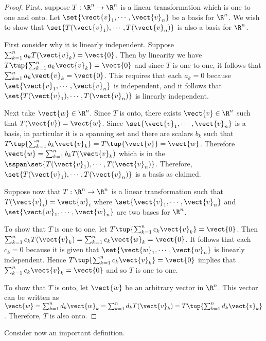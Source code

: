 \begin{proof}
First, suppose $T:\R^n \to \R^n$ is a linear
transformation which is one to one and onto. Let $\set{
\vect{v}_{1},\cdots ,\vect{v}_{n}} $ be a basis for
$\R^n$. We wish to show that $\set{T(\vect{v}_{1}),\cdots ,
T(\vect{v}_{n})} $ is also a basis for $\R^n$. 

First consider why it is linearly independent. Suppose
$\sum_{k=1}^{n}a_{k}T(\vect{v}_{k})=\vect{0}$. Then by linearity we have $T\tup{
\sum_{k=1}^{n}a_{k}\vect{v}_{k}} =\vect{0}$ and since $T$ is one
to one, it follows that $\sum_{k=1}^{n}a_{k}\vect{v}_{k}=\vect{0}$.
This requires that  each $a_{k}=0$ because $\set{\vect{v}_{1},\cdots,
\vect{v}_{n}} $ is independent, and it follows that $\set{
T(\vect{v}_{1}),\cdots , T(\vect{v}_{n})} $ is linearly
independent. 


Next take $\vect{w}\in \R^n$. Since $T$ is onto,
there exists $\vect{v}\in \R^n$ such that
$T(\vect{v})=\vect{w}$. Since $ \set{\vect{v}_{1},\cdots
,\vect{v}_{n}} $ is a basis, in particular it is a spanning set
and there are scalars $b_{k}$ such that $T\tup{
\sum_{k=1}^{n}b_{k}\vect{v} _{k}} =T\tup{\vect{v}}
=\vect{w}$. Therefore $\vect{w} =\sum_{k=1}^{n}b_{k}T(\vect{v}_{k})$
which is in the $\sspan\set{T(\vect{v}_{1}),\cdots ,
T(\vect{v}_{n})}$. Therefore, $\set{T(\vect{v}_{1}),\cdots
,T(\vect{v}_{n}) } $ is a basis as claimed.

Suppose now that $T: \R^n \to \R^n$ is a linear
transformation such that $T(\vect{v}_{i})=\vect{w}_{i}$ where
$\set{\vect{v} _{1},\cdots ,\vect{v}_{n}} $ and $\set{
\vect{w}_{1},\cdots , \vect{w}_{n}} $ are two bases for
$\R^n$. 

To show that $T$ is one to one, let $T\tup{
\sum_{k=1}^{n}c_{k}\vect{v}_{k}} =\vect{0}$. Then
$\sum_{k=1}^{n}c_{k}T(\vect{v}_{k})=\sum_{k=1}^{n}c_{k}\vect{w}_{k}=\vect{
0}$. It follows that each $c_{k} = 0$ because it is given that
$\set{\vect{w} _{1},\cdots ,\vect{w}_{n}} $ is linearly
independent. Hence $T\tup{\sum_{k=1}^{n}c_{k}\vect{v}_{k}}
=\vect{0}$ implies that $\sum_{k=1}^{n}c_{k}\vect{v}_{k}=\vect{0}$ and
so $T$ is one to one.  

To show that $T$ is onto, let $\vect{w}$ be an arbitrary vector in
$\R^n$. This vector can be written as $\vect{w} =
\sum_{k=1}^{n}d_k\vect{w}_k =
\sum_{k=1}^{n}d_{k}T(\vect{v}_{k})=T\tup{\sum_{k=1}^{n}d_{k}
\vect{v}_{k}}$.  Therefore, $T$ is also onto. 
\end{proof}

Consider now an important definition.

